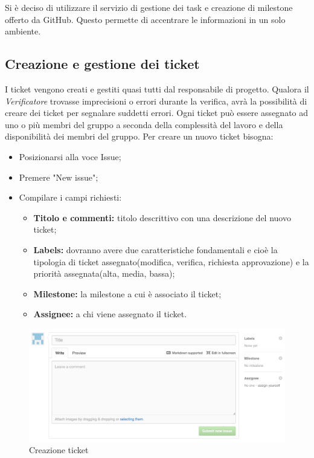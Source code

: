 Si è deciso di utilizzare il servizio di gestione dei \gls{task} e creazione di \gls{milestone} offerto da \gls{GitHub}. Questo permette di accentrare le informazioni in un solo ambiente.\\

\subsection{Creazione e gestione dei ticket}

I \gls{ticket} vengono creati e gestiti quasi tutti dal responsabile di progetto.
Qualora il \textit{Verificatore} trovasse imprecisioni o errori durante la verifica, avrà la possibilità di creare dei \gls{ticket} per segnalare suddetti errori.
Ogni \gls{ticket} può essere assegnato ad uno o più membri del gruppo a seconda della complessità del lavoro e della disponibilità dei membri del gruppo.
Per creare un nuovo \gls{ticket} bisogna:

\begin{itemize}
	\item Posizionarsi alla voce Issue;
	\item Premere "New issue";
	\item Compilare i campi richiesti:
		\begin{itemize}
			\item \textbf{Titolo e commenti:} titolo descrittivo con una descrizione del nuovo \gls{ticket};
			\item \textbf{Labels:} dovranno avere due caratteristiche fondamentali e cioè la tipologia di \gls{ticket} assegnato(modifica, verifica, richiesta approvazione) e la priorità assegnata(alta, media, bassa);
			\item \textbf{\gls{Milestone}:} la \gls{milestone} a cui è associato il \gls{ticket};
			\item \textbf{Assignee:} a chi viene assegnato il \gls{ticket}.
		\end{itemize}
\end{itemize}
\begin{figure}[h]
\centering
\includegraphics[width=0.7\linewidth]{img/ticket}
\caption[Creazione ticket]{Creazione \gls{ticket}}
\label{fig:ticket}
\end{figure}


